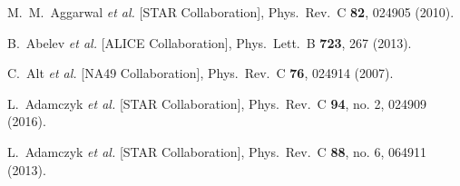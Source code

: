 \begin{thebibliography}{99}
  M.~M.~Aggarwal {\it et al.} [STAR Collaboration],
  Phys.\ Rev.\ C {\bf 82}, 024905 (2010).


  B.~Abelev {\it et al.} [ALICE Collaboration],
  Phys.\ Lett.\ B {\bf 723}, 267 (2013).
  
  C.~Alt {\it et al.} [NA49 Collaboration],
  Phys.\ Rev.\ C {\bf 76}, 024914 (2007).

  L.~Adamczyk {\it et al.} [STAR Collaboration],
  Phys.\ Rev.\ C {\bf 94}, no. 2, 024909 (2016).

  L.~Adamczyk {\it et al.} [STAR Collaboration],
  Phys.\ Rev.\ C {\bf 88}, no. 6, 064911 (2013).


\end{thebibliography}
